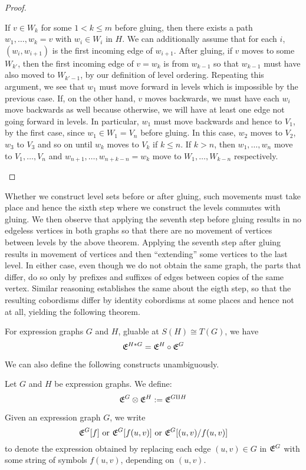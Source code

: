 \begin{proof}
\begin{enmrt}
\li If $v \in W_k$ for some $1 < k \leq m$ before gluing, then there exists a
path $w_1, \dots, w_k = v$ with $w_i \in W_i$ in $H$. We can additionally assume
that for each $i$, $(w_i, w_{i + 1})$ is the first incoming edge of $w_{i + 1}$.
After gluing, if $v$ moves to some $W_{k'}$, then the first incoming edge of
$v = w_k$ is from $w_{k - 1}$ so that $w_{k - 1}$ must have also moved to
$W_{k' - 1}$, by our definition of level ordering. Repeating this argument, we
see that $w_1$ must move forward in levels which is impossible by the previous
case. If, on the other hand, $v$ moves backwards, we must have each $w_i$ move
backwards as well because otherwise, we will have at least one edge not going
forward in levels. In particular, $w_1$ must move backwards and hence to $V_1$,
by the first case, since $w_1 \in W_1 = V_n$ before gluing.
In this case, $w_2$ moves to $V_2$, $w_3$ to $V_3$ and so on until $w_k$ moves
to $V_k$ if $k \leq n$. If $k > n$, then $w_1, \dots, w_n$ move to
$V_1, \dots, V_n$ and $w_{n + 1}, \dots, w_{n + k - n} = w_k$ move to
$W_1, \dots, W_{k - n}$ respectively.
\end{enmrt}
\end{proof}

Whether we construct level sets before or after gluing, such movements must take
place and hence the sixth step where we construct the levels commutes with
gluing. We then observe that applying the seventh step before gluing results in
no edgeless vertices in both graphs so that there are no movement of vertices
between levels by the above theorem. Applying the seventh step after gluing
results in movement of vertices and then ``extending'' some vertices to the last
level. In either case, even though we do not obtain the same graph, the parts
that differ, do so only by prefixes and suffixes of edges between copies of the
same vertex. Similar reasoning establishes the same about the eigth step, so
that the resulting cobordisms differ by identity cobordisms at some places and
hence not at all, yielding the following theorem.

\begin{thm}
For expression graphs $G$ and $H$, gluable at $S(H) \cong T(G)$, we have
\[
  \mathfrak{E}^{H * G} = \mathfrak{E}^{H} \circ \mathfrak{E}^{G}
\]
\end{thm}

We can also define the following constructs unambiguously.

\begin{defn}
Let $G$ and $H$ be expression graphs. We define:
\[
  \mathfrak{E}^{G} \otimes \mathfrak{E}^{H} := \mathfrak{E}^{G \amalg H}
\]
\end{defn}

\begin{defn}
Given an expression graph $G$, we write
\[
  \mathfrak{E}^{G}[f] \text{ or } \mathfrak{E}^{G}[f(u, v)] \text{ or } \mathfrak{E}^{G}[(u, v)/f(u, v)]
\]
to denote the expression obtained by replacing each edge $(u, v) \in G$ in
$\mathfrak{E}^{G}$ with some string of symbols $f(u, v)$, depending on $(u, v)$.
\end{defn}

